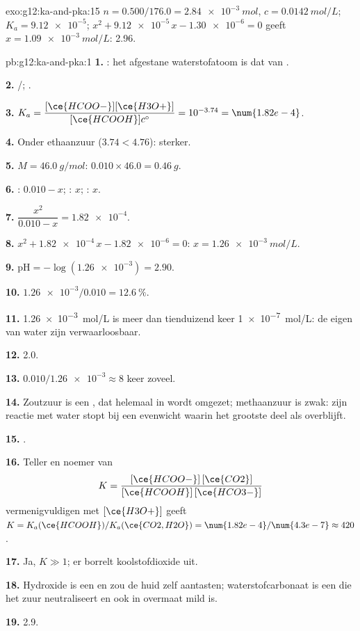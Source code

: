 \begin{solution}{exo:g12:ka-and-pka:15}
$n = 0.500 / 176.0 = \qty{2.84e-3}{mol}$, $c = \qty{0.0142}{mol/L}$;
$K_a = \num{9.12e-5}$; $x^2 + \num{9.12e-5}\,x - \num{1.30e-6} = 0$ geeft
$x = \qty{1.09e-3}{mol/L}$:  2.96.
\end{solution}

\begin{solution}{pb:g12:ka-and-pka:1}
\textbf{1.} : het afgestane waterstofatoom is dat van
.

\textbf{2.} /; .

\textbf{3.} $K_a = \dfrac{[\ce{HCOO-}][\ce{H3O+}]}{[\ce{HCOOH}]c^\circ} =
10^{-3.74} = \num{1.82e-4}$.

\textbf{4.} Onder ethaanzuur ($3.74 < 4.76$): sterker.

\textbf{5.} $M = \qty{46.0}{g/mol}$: $0.010 \times 46.0 = \qty{0.46}{g}$.

\textbf{6.} : $0.010 - x$; : $x$; : $x$.

\textbf{7.} $\dfrac{x^2}{0.010 - x} = \num{1.82e-4}$.

\textbf{8.} $x^2 + \num{1.82e-4}\,x - \num{1.82e-6} = 0$:
$x = \qty{1.26e-3}{mol/L}$.

\textbf{9.} $\mathrm{pH} = -\log(\num{1.26e-3}) = 2.90$.

\textbf{10.} $\num{1.26e-3}/0.010 = \qty{12.6}{\percent}$.

\textbf{11.} \qty{1.26e-3}{mol/L} is meer dan tienduizend keer
\qty{1e-7}{mol/L}: de eigen  van water zijn verwaarloosbaar.

\textbf{12.}  2.0.

\textbf{13.} $0.010 / \num{1.26e-3} \approx 8$ keer zoveel.

\textbf{14.} Zoutzuur is een , dat helemaal in  wordt
omgezet; methaanzuur is zwak: zijn reactie met water stopt bij een
evenwicht waarin het grootste deel als  overblijft.

\textbf{15.} .

\textbf{16.} Teller en noemer van
\[
  K = \frac{[\ce{HCOO-}]\,[\ce{CO2}]}{[\ce{HCOOH}]\,[\ce{HCO3-}]}
\]
vermenigvuldigen met $[\ce{H3O+}]$ geeft $K = K_a(\ce{HCOOH}) / K_a(\ce{CO2,H2O}) =
\num{1.82e-4}/\num{4.3e-7} \approx 420$.

\textbf{17.} Ja, $K \gg 1$; er borrelt koolstofdioxide uit.

\textbf{18.} Hydroxide is een  en zou de huid zelf aantasten;
waterstofcarbonaat is een  die het zuur neutraliseert en ook
in overmaat mild is.

\textbf{19.}  2.9.
\end{solution}
